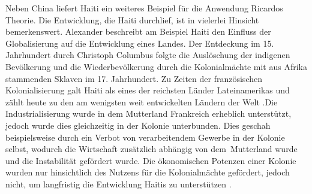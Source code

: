 Neben China liefert Haiti ein weiteres Beispiel f{\"u}r die Anwendung Ricardos Theorie. Die Entwicklung, die Haiti durchlief, ist in vielerlei Hinsicht bemerkenswert. Alexander \citet{King.2005} beschreibt am Beispiel Haiti den Einfluss der Globalisierung auf die Entwicklung eines Landes. Der Entdeckung im 15. Jahrhundert durch Christoph Columbus folgte die Ausl{\"o}schung der indigenen Bev{\"o}lkerung und die Wiederbev{\"o}lkerung durch die Kolonialm{\"a}chte mit aus Afrika stammenden Sklaven im 17. Jahrhundert. Zu Zeiten der franz{\"o}sischen Kolonialisierung galt Haiti als eines der reichsten L{\"a}nder Lateinamerikas und z{\"a}hlt heute zu den am wenigsten weit entwickelten L{\"a}ndern der Welt \citep{Beck.2008,IBP.2013,Stauber.2014b}.\newline Die Industrialisierung wurde in dem Mutterland Frankreich erheblich unterst{\"u}tzt, jedoch wurde dies gleichzeitig in der Kolonie unterbunden. Dies geschah beispielsweise durch ein Verbot von verarbeitendem Gewerbe in der Kolonie selbst, wodurch die Wirtschaft zus{\"a}tzlich abh{\"a}ngig  von dem~Mutterland wurde und die Instabilit{\"a}t gef{\"o}rdert wurde. Die {\"o}konomischen Potenzen einer Kolonie wurden nur hinsichtlich des Nutzens f{\"u}r die Kolonialm{\"a}chte gef{\"o}rdert, jedoch nicht, um langfristig die Entwicklung Haitis zu unterst{\"u}tzen \citep{King.2005}.\newline


